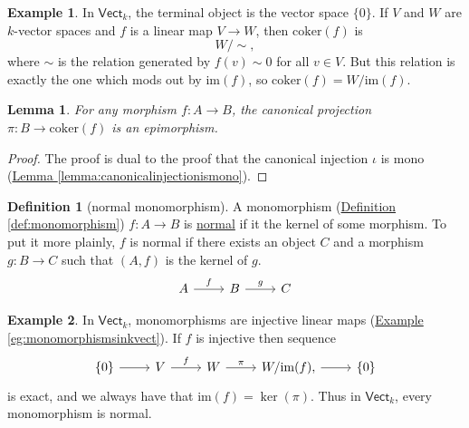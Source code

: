 \documentclass[a4paper]{report}
\newcommand{\defn}[1]{\ul{#1}}
\newcommand{\coker}{\mathrm{coker}}
\theoremstyle{definition}
\newtheorem{definition}{Definition}[section]
\newtheorem{example}{Example}[section]
\theoremstyle{plain}
\newtheorem{lemma}{Lemma}[section]
\theoremstyle{remark}
\begin{document}
\begin{example}
  \label{eg:invectcokernelsarequotientsbyimage}
  In $\mathsf{Vect}_{k}$, the terminal object is the vector space $\{0\}$. If $V$ and $W$ are $k$-vector spaces and $f$ is a linear map $V \to W$, then $\coker(f)$ is
  \begin{equation*}
    W / \sim, 
  \end{equation*}
  where $\sim$ is the relation generated by $f(v) \sim 0$ for all $v \in V$. But this relation is exactly the one which mods out by $\mathrm{im}(f)$, so $\coker(f) = W / \mathrm{im}(f)$.
\end{example}

\begin{lemma}
  \label{lemma:canonicalsurjectionisepi}
  For any morphism $f\colon A \to B$, the canonical projection $\pi\colon B \to \coker(f)$ is an epimorphism.
\end{lemma}
\begin{proof}
  The proof is dual to the proof that the canonical injection $\iota$ is mono (\hyperref[lemma:canonicalinjectionismono]{Lemma \ref*{lemma:canonicalinjectionismono}}).
\end{proof}

\begin{definition}[normal monomorphism]
  \label{def:normalmonomorphism}
  A monomorphism (\hyperref[def:monomorphism]{Definition \ref*{def:monomorphism}}) $f\colon A \to B$ is \defn{normal} if it the kernel of some morphism. To put it more plainly, $f$ is normal if there exists an object $C$ and a morphism $g\colon B \to C$ such that $(A, f)$ is the kernel of $g$.
  \begin{equation*}
    \begin{tikzcd}
      A \arrow[r, "f"] & B \arrow[r, "g"] & C
    \end{tikzcd}
  \end{equation*}
\end{definition}

\begin{example}
  In $\mathsf{Vect}_{k}$, monomorphisms are injective linear maps (\hyperref[eg:monomorphismsinkvect]{Example \ref*{eg:monomorphismsinkvect}}). If $f$ is injective then sequence
  \begin{equation*}
    \begin{tikzcd}
      \{0\} \arrow[r] & V \arrow[r, "f"] & W \arrow[r, "\pi"] & W/\mathrm{im}(f) \arrow[r], & \{0\}
    \end{tikzcd}
  \end{equation*}
  is exact, and we always have that $\mathrm{im}(f) = \ker(\pi)$. Thus in $\mathsf{Vect}_{k}$, every monomorphism is normal.
\end{example}
\end{document}
